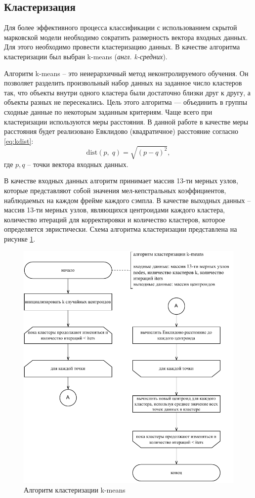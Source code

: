 \subsection{Кластеризация}
Для более эффективного процесса классификации с использованием скрытой марковской модели необходимо сократить размерность вектора входных данных. Для этого необходимо провести кластеризацию данных. В качестве алгоритма кластеризации был выбран k-means (\textit{англ. k-средних}).

Алгоритм k-means -- это неиерархичный метод неконтролируемого обучения. Он позволяет разделить произвольный набор данных на заданное число кластеров так, что объекты внутри одного кластера были достаточно
близки друг к другу, а объекты разных не пересекались. Цель этого алгоритма — объединить в группы сходные данные по некоторым заданным критериям. Чаще всего при кластеризации используются меры расстояния. В данной работе в качестве меры расстояния будет реализовано Евклидово (квадратичное) расстояние согласно \ref{eq:kdist}:
\begin{equation}\label{eq:kdist}
	\mathrm{dist}(p,\;q) = \sqrt{(p - q)^2},
\end{equation}
где $p, q$ -- точки вектора входных данных.

В качестве входных данных алгоритм принимает массив 13-ти мерных узлов, которые представляют собой значения мел-кепстральных коэффициентов, наблюдаемых на каждом фрейме каждого сэмпла. В качестве выходных данных -- массив 13-ти мерных узлов, являющихся центроидами каждого кластера, количество итераций для корректировки и количество кластеров, которое определяется эвристически. Схема алгоритма кластеризации представлена на рисунке \ref{fig:kmeans}.

\begin{figure}[H]
	\centering
	\includegraphics[width=0.75\linewidth]{assets/kmeans-flowchart}
	\caption{Алгоритм кластеризации k-means}
	\label{fig:kmeans}
\end{figure}

